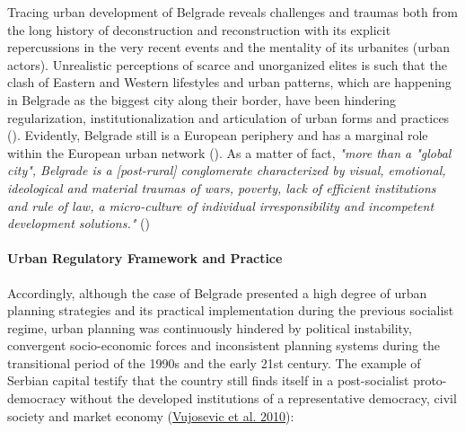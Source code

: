 \documentclass[11pt]{report}
\begin{document}
Tracing  urban  development  of  Belgrade  reveals  challenges  and  traumas both from the long history of deconstruction and reconstruction with its explicit repercussions in the very recent events and the mentality of its urbanites (urban actors).
Unrealistic perceptions of scarce and unorganized elites is such that the clash of Eastern and Western lifestyles and urban patterns, which are  happening in Belgrade as the biggest city along their border, have been hindering regularization, institutionalization and articulation of urban forms and practices (\cite{other ref Samardzic in Doytchinov 2015}).
Evidently, Belgrade still is a European periphery and has a marginal role within the European urban network (\href{ref}{\citealt{vujovic_belgrades_2007}}). 
As a matter of fact, \textit{"more  than  a  "global  city",  Belgrade  is  a  [post-rural]  conglomerate characterized by visual, emotional, ideological and material traumas of wars, poverty, lack of efficient institutions and rule of law, a micro-culture of  individual  irresponsibility  and  incompetent  development  solutions."} (\href{ref}{\citealt{doytchinov_belgrade_2015}}) 
\\

\paragraph{Urban Regulatory Framework and Practice}

Accordingly, although the case of Belgrade presented a high degree of urban planning strategies and its practical implementation during the previous socialist regime, urban planning was continuously hindered by political instability, convergent socio-economic forces and inconsistent planning systems during the transitional period of the 1990s and the early 21st century. 
The example of Serbian capital testify that the country still finds itself in a post-socialist proto-democracy without the developed institutions of a representative democracy, civil society and market economy (\href{ref}{Vujosevic et al. 2010}):
 
\end{document}
